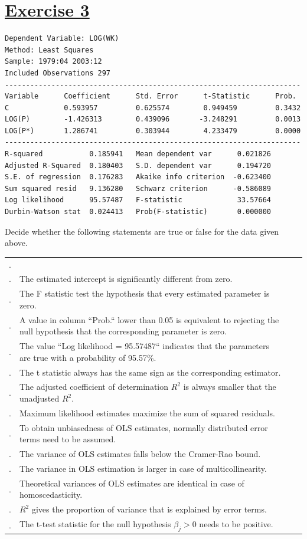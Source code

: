 \documentclass[captions=tableheading, 12pt, headings=small, parskip=half]{scrartcl}
\makeatletter
\newcounter{tfno}
\newcommand{\mybox}{\resizebox{.5cm}{!}{\raisebox{-.5ex}{$\Box$}}}
\newenvironment{truefalse}{%
	\renewcommand\arraystretch{1.5}
	\setlength\LTleft{0pt}
	\setlength\LTright{0pt}
	\begin{longtable}{>{\stepcounter{tfno}\thetfno.}cp{.5\textwidth}@{\extracolsep{\fill}}cc}
		\multicolumn{1}{r}{}&  & \fbox{\parbox{\widthof{True}}{True}} & \fbox{\parbox{\widthof{False}}{False}}  \\
	}{%
	\end{longtable}
	\renewcommand\arraystretch{1}
}
\newcommand\tfquestion[1]{ & #1 & \mybox  & \mybox  \\}
\makeatother
\begin{document}
\section*{\underline{Exercise 3}}
\begin{verbatim}
Dependent Variable: LOG(WK)
Method: Least Squares
Sample: 1979:04 2003:12
Included Observations 297
----------------------------------------------------------------------
Variable      Coefficient      Std. Error      t-Statistic      Prob.
C             0.593957         0.625574        0.949459         0.3432
LOG(P)        -1.426313        0.439096       -3.248291         0.0013
LOG(P*)       1.286741         0.303944        4.233479         0.0000
----------------------------------------------------------------------
R-squared           0.185941   Mean dependent var      0.021826
Adjusted R-Squared  0.180403   S.D. dependent var      0.194720
S.E. of regression  0.176283   Akaike info criterion  -0.623400
Sum squared resid   9.136280   Schwarz criterion      -0.586089
Log likelihood      95.57487   F-statistic             33.57664
Durbin-Watson stat  0.024413   Prob(F-statistic)       0.000000
\end{verbatim}
Decide whether the following statements are true or false for the data given above. 
\begin{truefalse}
	\tfquestion{The estimated intercept is significantly different from zero.}
	\tfquestion{The F statistic test the hypothesis that every estimated parameter is zero.}
	\tfquestion{A value in column ``Prob.`` lower than 0.05 is equivalent to rejecting the null hypothesis that the corresponding parameter is zero.}
	\tfquestion{The value ``Log likelihood = 95.57487`` indicates that the parameters are true with a probability of 95.57\%.}
	\tfquestion{The t statistic always has the same sign as the corresponding estimator.}
	\tfquestion{The adjusted coefficient of determination $R^2$ is always smaller that the unadjusted $R^2$.}
	\tfquestion{Maximum likelihood estimates maximize the sum of squared residuals.}
	\tfquestion{To obtain unbiasedness of OLS estimates, normally distributed error terms need to be assumed.}
	\tfquestion{The variance of OLS estimates falls below the Cramer-Rao bound.}
	\tfquestion{The variance in OLS estimation is larger in case of multicollinearity.}
	\tfquestion{Theoretical variances of OLS estimates are identical in case of homoscedasticity.}
	\tfquestion{$R^2$ gives the proportion of variance that is explained by error terms.}
	\tfquestion{The t-test statistic for the null hypothesis $\beta_j > 0$ needs to be positive.}
\end{truefalse}
\end{document}
